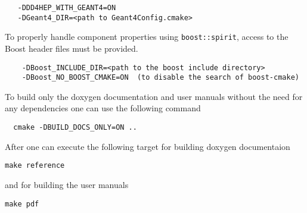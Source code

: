\begin{verbatim}
   -DDD4HEP_WITH_GEANT4=ON
   -DGeant4_DIR=<path to Geant4Config.cmake>
\end{verbatim}

To properly handle component properties using \texttt{boost::spirit}, access to the Boost header files must be provided.
\begin{verbatim}
    -DBoost_INCLUDE_DIR=<path to the boost include directory>
    -DBoost_NO_BOOST_CMAKE=ON  (to disable the search of boost-cmake)
\end{verbatim}

To build only the doxygen documentation and user manuals without the need for any dependencies one can use the following command
\begin{verbatim}
  cmake -DBUILD_DOCS_ONLY=ON ..
\end{verbatim}
After one can execute the following target for building doxygen documentaion
\begin{verbatim}
make reference
\end{verbatim}
and for building the user manuals
\begin{verbatim}
make pdf
\end{verbatim}

